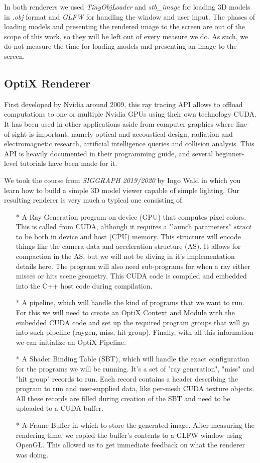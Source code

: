 In both renderers we used \textit{TinyObjLoader} and \textit{stb\_image} for loading 3D models in \textit{.obj} format and \textit{GLFW} for handling the window and user input. The phases of loading models and presenting the rendered image to the screen are out of the scope of this work, so they will be left out of every measure we do. As such, we do not measure the time for loading models and presenting an image to the screen.

\subsection{OptiX Renderer}
First developed by Nvidia around 2009, this ray tracing API allows to offload computations to one or multiple Nvidia GPUs using their own technology CUDA. It has been used in other applications aside from computer graphics where line-of-sight is important, namely optical and accoustical design, radiation and electromagnetic research, artificial intelligence queries and collision analysis. This API is heavily documented in their programming guide, and several beginner-level tutorials have been made for it.

We took the course from \textit{SIGGRAPH 2019/2020} by Ingo Wald in which you learn how to build a simple 3D model viewer capable of simple lighting. Our resulting renderer is very much a typical one consisting of:

\begin{itemize}
  \item[*]{A Ray Generation program on device (GPU) that computes pixel colors. This is called from CUDA, although it requires a "launch parameters" \textit{struct} to be both in device and host (CPU) memory. This structure will encode things like the camera data and acceleration structure (AS). It allows for compaction in the AS, but we will not be diving in it's implementation details here. The program will also need sub-programs for when a ray either misses or hits scene geometry. This CUDA code is compiled and embedded into the C++ host code during compilation.}
  \item[*]{A pipeline, which will handle the kind of programs that we want to run. For this we will need to create an OptiX Context and Module with the embedded CUDA code and set up the required program groups that will go into such pipeline (raygen, miss, hit group). Finally, with all this information we can initialize an OptiX Pipeline.}
  \item[*]{A Shader Binding Table (SBT), which will handle the exact configuration for the programs we will be running. It's a set of "ray generation", "miss" and "hit group" records to run. Each record contains a header describing the program to run and user-supplied data, like per-mesh CUDA texture objects. All these records are filled during creation of the SBT and need to be uploaded to a CUDA buffer.}
  \item[*]{A Frame Buffer in which to store the generated image. After measuring the rendering time, we copied the buffer's contents to a GLFW window using OpenGL. This allowed us to get immediate feedback on what the renderer was doing.}
\end{itemize}

